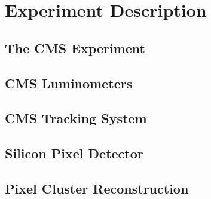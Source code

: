 \chapter{Experiment Description}
 
 
\section{The CMS Experiment}


\section{CMS Luminometers}
\label{Luminometers}


\section{CMS Tracking System}


\section{Silicon Pixel Detector}


\section{Pixel Cluster Reconstruction}

